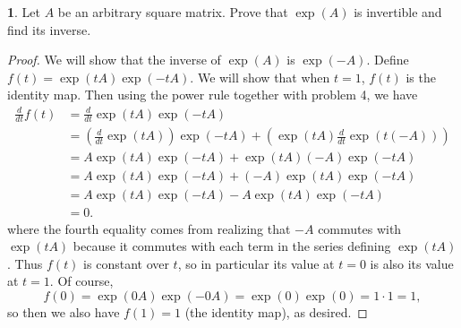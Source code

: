 \documentclass[12pt]{article}
\theoremstyle{definition}
\newtheorem{ex}{}
\begin{document}
\begin{ex}
	Let $A$ be an arbitrary square matrix.
	Prove that $\exp(A)$ is invertible and find its inverse.
\end{ex}
\begin{proof}
	We will show that the inverse of $\exp(A)$ is $\exp(-A)$.
	Define $f(t) = \exp(tA)\exp(-tA)$.
	We will show that when $t = 1$, $f(t)$ is the identity map.
	Then using the power rule together with problem 4, we have \begin{align*}
		\frac{d}{dt} f(t) & = \frac{d}{dt} \exp(tA)\exp(-tA)                                                              \\
		                  & = \left(\frac{d}{dt} \exp(tA)\right)\exp(-tA) + \left(\exp(tA)\frac{d}{dt} \exp(t(-A))\right) \\
		                  & = A\exp(tA)\exp(-tA) + \exp(tA)(-A)\exp(-tA)                                                  \\
		                  & = A\exp(tA)\exp(-tA) + (-A)\exp(tA)\exp(-tA)                                                  \\
		                  & = A\exp(tA)\exp(-tA) - A\exp(tA)\exp(-tA)                                                     \\
		                  & = 0.
	\end{align*}
	where the fourth equality comes from realizing that $-A$ commutes with $\exp(tA)$ because it commutes with each term in the series defining $\exp(tA)$.
	Thus $f(t)$ is constant over $t$, so in particular its value at $t = 0$ is also its value at $t = 1$.
	Of course, \begin{equation*}
		f(0) = \exp(0A)\exp(-0A) = \exp(0)\exp(0) = 1 \cdot 1 = 1,
	\end{equation*} so then we also have $f(1) = 1$ (the identity map), as desired.
\end{proof}
\end{document}
